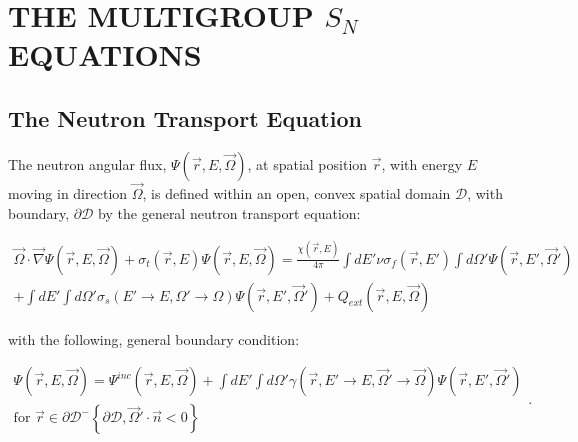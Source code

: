 %
%
%
\chapter{\uppercase {The Multigroup $S_N$ Equations}}

\section{The Neutron Transport Equation}
\label{sec::Sn_neut}

The neutron angular flux, $\Psi (\vec{r}, E, \vec{\Omega})$, at spatial position $\vec{r}$, with energy $E$ moving in direction $\vec{\Omega}$, is defined within an open, convex spatial domain $\mathcal{D}$, with boundary, $\partial \mathcal{D}$ by the general neutron transport equation:


\begin{equation}
\label{eq::transport_eq_full_source}
\begin{aligned}
	\vec{\Omega} \cdot \vec{\nabla} \Psi (\vec{r}, E, \vec{\Omega})+ \sigma_t (\vec{r}, E) \Psi (\vec{r}, E, \vec{\Omega}) = \frac{\chi (\vec{r}, E)}{4 \pi} \int dE' \nu \sigma_f (\vec{r}, E') \int d\Omega' \Psi (\vec{r}, E', \vec{\Omega}') \\ 
	+ \int dE' \int d\Omega' \sigma_s (E' \rightarrow E, \Omega' \rightarrow \Omega) \Psi (\vec{r}, E', \vec{\Omega}') + Q_{ext} (\vec{r}, E, \vec{\Omega})
\end{aligned}
\end{equation}

\noindent with the following, general boundary condition:

\begin{equation}
\label{eq::transport_bc_full}
\begin{aligned}
	\Psi (\vec{r}, E, \vec{\Omega}) = \Psi^{inc} (\vec{r}, E, \vec{\Omega}) + \int dE' \int d\Omega' \gamma (\vec{r}, E' \rightarrow E, \vec{\Omega}' \rightarrow \vec{\Omega}) \Psi (\vec{r}, E', \vec{\Omega}') \\
	\text{for } \vec{r} \in \partial \mathcal{D}^{-} \left\{   \partial \mathcal{D}, \vec{\Omega}' \cdot \vec{n} < 0  \right\}
\end{aligned} .
\end{equation}

